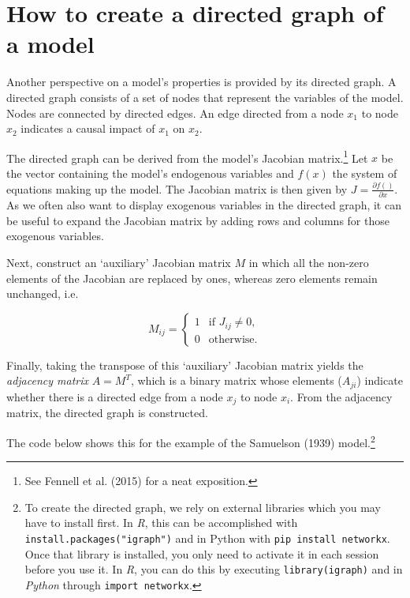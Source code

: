 \documentclass[
  letterpaper,
  DIV=11,
  numbers=noendperiod]{scrreprt}
\begin{document}
\section{How to create a directed graph of a
model}\label{how-to-create-a-directed-graph-of-a-model}

Another perspective on a model's properties is provided by its directed
graph. A directed graph consists of a set of nodes that represent the
variables of the model. Nodes are connected by directed edges. An edge
directed from a node \(x_1\) to node \(x_2\) indicates a causal impact
of \(x_1\) on \(x_2\).

The directed graph can be derived from the model's Jacobian
matrix.\footnote{See Fennell et al. (2015) for a neat exposition.} Let
\(x\) be the vector containing the model's endogenous variables and
\(f(x)\) the system of equations making up the model. The Jacobian
matrix is then given by \(J=\frac{\partial f()}{\partial x}\). As we
often also want to display exogenous variables in the directed graph, it
can be useful to expand the Jacobian matrix by adding rows and columns
for those exogenous variables.

Next, construct an `auxiliary' Jacobian matrix \(M\) in which all the
non-zero elements of the Jacobian are replaced by ones, whereas zero
elements remain unchanged, i.e.

\[
M_{ij} =
\begin{cases}
1 & \text{if }  J_{ij} \neq 0, \\
0 & \text{otherwise.}
\end{cases}
\]

Finally, taking the transpose of this `auxiliary' Jacobian matrix yields
the \emph{adjacency matrix} \(A=M^T\), which is a binary matrix whose
elements (\(A_{ji}\)) indicate whether there is a directed edge from a
node \(x_j\) to node \(x_i\). From the adjacency matrix, the directed
graph is constructed.

The code below shows this for the example of the Samuelson (1939)
model.\footnote{To create the directed graph, we rely on external
  libraries which you may have to install first. In \emph{R}, this can
  be accomplished with \texttt{install.packages("igraph")} and in Python
  with \texttt{pip\ install\ networkx}. Once that library is installed,
  you only need to activate it in each session before you use it. In
  \emph{R}, you can do this by executing \texttt{library(igraph)} and in
  \emph{Python} through \texttt{import\ networkx}.}
\end{document}

